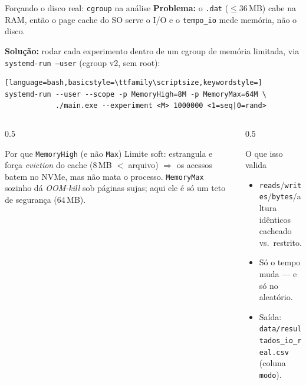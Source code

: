 \documentclass[aspectratio=169,11pt]{beamer}
\begin{document}
\begin{frame}[fragile]{Forçando o disco real: \texttt{cgroup} na análise}
  \footnotesize \textbf{Problema:} o \texttt{.dat} ($\le$36\,MB) cabe na RAM, então o
  \alert{page cache do SO} serve o I/O e o \texttt{tempo\_io} mede memória, não o disco.
  \vspace{0.4em}

  \textbf{Solução:} rodar cada experimento dentro de um \alert{cgroup} de
  memória limitada, via \texttt{systemd-run --user} (cgroup v2, \alert{sem root}):
  \begin{lstlisting}[language=bash,basicstyle=\ttfamily\scriptsize,keywordstyle=]
systemd-run --user --scope -p MemoryHigh=8M -p MemoryMax=64M \
            ./main.exe --experiment <M> 1000000 <1=seq|0=rand>
  \end{lstlisting}
  \vspace{-0.1em}
  \begin{columns}[T,onlytextwidth]
    \begin{column}{0.5\textwidth}
      \begin{block}{Por que \texttt{MemoryHigh} (e não \texttt{Max})}
        \scriptsize
        Limite \alert{soft}: estrangula e força \emph{eviction} do cache (8\,MB
        $<$ arquivo) $\Rightarrow$ os acessos batem no NVMe, mas \alert{não mata} o
        processo. \texttt{MemoryMax} sozinho dá \emph{OOM-kill} sob páginas sujas;
        aqui ele é só um teto de segurança (64\,MB).
      \end{block}
    \end{column}
    \begin{column}{0.5\textwidth}
      \begin{block}{O que isso valida}
        \scriptsize
        \begin{itemize}
          \item \texttt{reads}/\texttt{writes}/\texttt{bytes}/altura
            \alert{idênticos} cacheado vs.\ restrito.
          \item Só o \alert{tempo} muda --- e só no aleatório.
          \item Saída: \texttt{data/resultados\_io\_real.csv} (coluna \texttt{modo}).
        \end{itemize}
      \end{block}
    \end{column}
  \end{columns}
\end{frame}
\end{document}
